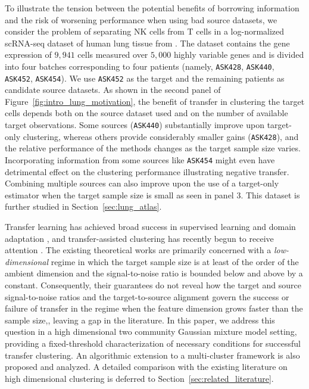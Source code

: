 \documentclass[10pt]{article}
\begin{document}
To illustrate the tension between the potential benefits of borrowing information and the risk of worsening performance when using bad source datasets, we consider the problem of separating NK cells from T cells in a log-normalized scRNA-seq dataset of human lung tissue from \citet{Vieira_Braga2019-nl}. The dataset contains the gene expression of $9{,}941$ cells measured over $5{,}000$ highly variable genes and is divided into four batches corresponding to four patients (namely, \texttt{ASK428}, \texttt{ASK440}, \texttt{ASK452}, \texttt{ASK454}). We use \texttt{ASK452} as the target and the remaining patients as candidate source datasets. 
As shown in the second panel of Figure~\ref{fig:intro_lung_motivation}, the benefit of transfer in clustering the target cells depends both on the source dataset used and on the number of available target observations. Some sources (\texttt{ASK440}) substantially improve upon target-only clustering, whereas others provide considerably smaller gains (\texttt{ASK428}), and the relative performance of the methods changes as the target sample size varies. Incorporating information from some sources like \texttt{ASK454} might even have detrimental effect on the clustering performance illustrating negative transfer. Combining multiple sources can also improve upon the use of a target-only estimator when the target sample size is small as seen in panel 3. This dataset is further studied in Section~\ref{sec:lung_atlas}.

Transfer learning has achieved broad success in supervised learning and domain
adaptation \citep{PanYang2010,Weiss2016,BenDavid2010}, and
transfer-assisted clustering has recently begun to receive attention \citep{wang2023transfergmm,tian2025robust}. The existing theoretical works are primarily concerned with a \emph{low-dimensional} regime in which the target
sample size is at least of the order of the ambient dimension and the signal-to-noise ratio is bounded below and above by a constant. Consequently, their
guarantees do not reveal how the target and source signal-to-noise ratios and the target-to-source alignment govern the success or failure of transfer in the regime when the feature dimension grows faster than the sample size,, leaving a gap in the literature. In this paper, we address this question in a high dimensional two community Gaussian mixture model setting, providing a fixed-threshold characterization of necessary conditions for successful transfer clustering. An algorithmic extension to a multi-cluster framework is also proposed and analyzed.  A detailed comparison with the existing literature on high dimensional clustering is deferred to Section~\ref{sec:related_literature}.
\end{document}
